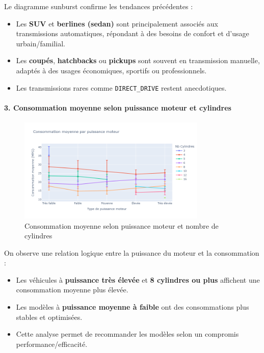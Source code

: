 \documentclass[12pt]{report}
\begin{document}
Le diagramme sunburst confirme les tendances précédentes :
\begin{itemize}
  \item Les \textbf{SUV} et \textbf{berlines (sedan)} sont principalement associés aux transmissions automatiques, répondant à des besoins de confort et d’usage urbain/familial.
  \item Les \textbf{coupés}, \textbf{hatchbacks} ou \textbf{pickups} sont souvent en transmission manuelle, adaptés à des usages économiques, sportifs ou professionnels.
  \item Les transmissions rares comme \texttt{DIRECT\_DRIVE} restent anecdotiques.
\end{itemize}

\paragraph{3. Consommation moyenne selon puissance moteur et cylindres}\mbox{}

\begin{figure}[H]
\centering
\includegraphics[width=0.8\textwidth]{hp_vs_cylinders.png}
\caption{Consommation moyenne selon puissance moteur et nombre de cylindres}
\end{figure}

On observe une relation logique entre la puissance du moteur et la consommation :
\begin{itemize}
  \item Les véhicules à \textbf{puissance très élevée} et \textbf{8 cylindres ou plus} affichent une consommation moyenne plus élevée.
  \item Les modèles à \textbf{puissance moyenne à faible} ont des consommations plus stables et optimisées.
  \item Cette analyse permet de recommander les modèles selon un compromis performance/efficacité.
\end{itemize}
\end{document}

